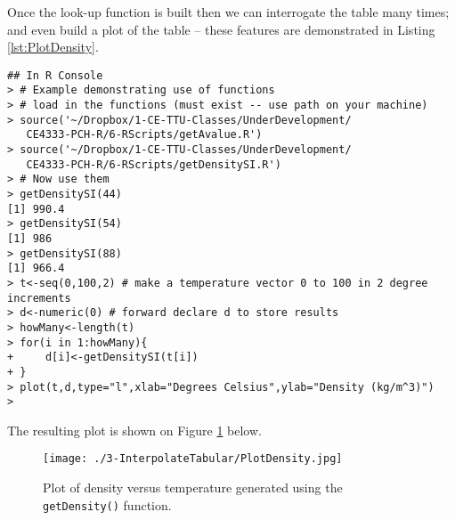Once the look-up function is built then we can  interrogate the table many times; and even build a plot of the table -- these features are demonstrated in Listing \ref{lst:PlotDensity}.

\begin{lstlisting}[caption=R code demonstrating use of getDensitySI(), label=lst:PlotDensity]
## In R Console  
> # Example demonstrating use of functions
> # load in the functions (must exist -- use path on your machine)
> source('~/Dropbox/1-CE-TTU-Classes/UnderDevelopment/
   CE4333-PCH-R/6-RScripts/getAvalue.R')
> source('~/Dropbox/1-CE-TTU-Classes/UnderDevelopment/
   CE4333-PCH-R/6-RScripts/getDensitySI.R')
> # Now use them
> getDensitySI(44)
[1] 990.4
> getDensitySI(54)
[1] 986
> getDensitySI(88)
[1] 966.4
> t<-seq(0,100,2) # make a temperature vector 0 to 100 in 2 degree increments
> d<-numeric(0) # forward declare d to store results
> howMany<-length(t)
> for(i in 1:howMany){
+     d[i]<-getDensitySI(t[i])
+ }
> plot(t,d,type="l",xlab="Degrees Celsius",ylab="Density (kg/m^3)")
> 
\end{lstlisting}  

The resulting plot is shown on Figure \ref{fig:PlotDensity} below.
\begin{figure}[htbp] %
   \centering
   \texttt{[image: ./3-InterpolateTabular/PlotDensity.jpg]} 
   \caption{Plot of density versus temperature generated using the \texttt{getDensity()} function.}
   \label{fig:PlotDensity}
\end{figure}



